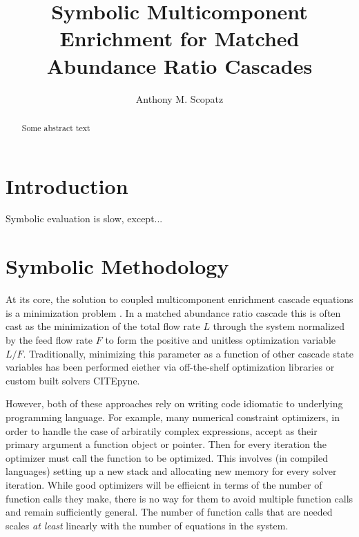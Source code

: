 \documentclass[preprint,12pt]{elsarticle}
\begin{document}
\begin{frontmatter}
\title{Symbolic Multicomponent Enrichment for Matched Abundance Ratio Cascades}

\author[chi]{Anthony M. Scopatz}

\address[chi]{The University of Chicago, The FLASH Center, 
              5754 S. Ellis Ave, Chicago, IL, 60637}


\begin{abstract}
Some abstract text
\end{abstract}

\begin{keyword}
\end{keyword}

\end{frontmatter}


%
%

\section{Introduction}
\label{sec:intro}
Symbolic evaluation is slow, except...


\section{Symbolic Methodology}
\label{sec:meth}
At its core, the solution to coupled multicomponent enrichment cascade equations is
a minimization problem \cite{Wood1999}.  In a matched abundance ratio 
\cite{DelaGarza1969} cascade this is often cast as the minimization of 
the total flow rate $L$ through the system normalized by the feed flow rate $F$ to 
form the positive and unitless optimization variable $L/F$.  Traditionally, 
minimizing this parameter as a function of other cascade state variables has been 
performed eiether via off-the-shelf optimization libraries 
\cite{doi:10.1080/01496391003793884} or custom built solvers CITEpyne.

However, both of these approaches rely on writing code idiomatic to underlying 
programming language.  For example, many numerical constraint optimizers, in order 
to handle the case of arbiratily complex expressions, accept as their primary 
argument a function object or pointer.  Then for every iteration the optimizer must 
call the function to be optimized.  This involves (in compiled languages) setting up 
a new stack and allocating new memory for every solver iteration.  While good 
optimizers will be effieicnt in terms of the number of function calls they make, 
there is no way for them to avoid multiple function calls and remain sufficiently 
general. The number of function calls that are needed scales \emph{at least} linearly 
with the number of equations in the system.
\end{document}
